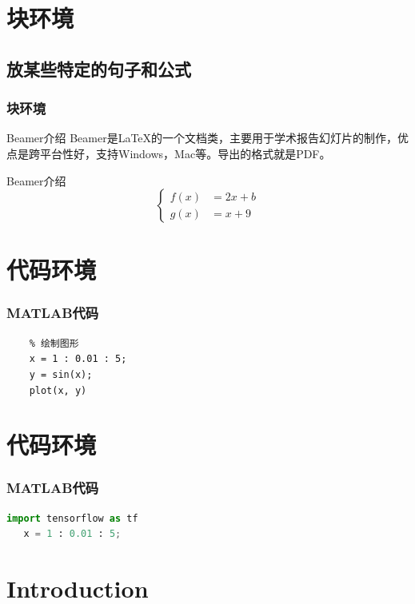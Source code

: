\documentclass[aspectratio=169, 10pt, utf8, mathserif]{beamer}
\numberwithin{equation}{section} %
\numberwithin{figure}{section} %
\begin{document}
\section{块环境}
\subsection{放某些特定的句子和公式}
\begin{frame}
	\frametitle{块环境}
	\begin{block}{Beamer介绍}
	Beamer是\LaTeX 的一个文档类，主要用于学术报告幻灯片的制作，优点是跨平台性好，支持Windows，Mac等。导出的格式就是PDF。
	\end{block}
	\begin{block}{Beamer介绍}
	\begin{equation}
	\left \{
	\begin{aligned}
	f(x) &= 2x + b \\
	g(x) &= x + 9
	\end{aligned}	
	\right.
	\end{equation}
	\end{block}

\end{frame}

\section{代码环境}
\begin{frame}[fragile] %
	\frametitle{MATLAB代码}  
	\begin{lstlisting}
	% 绘制图形
	x = 1 : 0.01 : 5;
	y = sin(x);
	plot(x, y)
	\end{lstlisting}
\end{frame}


\section{代码环境}
\begin{frame}[fragile]
	\frametitle{MATLAB代码}
	\begin{lstlisting}[language=Python]  
  import tensorflow as tf
   x = 1 : 0.01 : 5;
  \end{lstlisting}
\end{frame}

\section[Introduction 引言]{Introduction}\label{sec:1}
\end{document}
